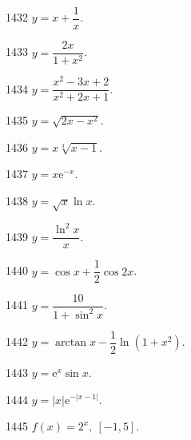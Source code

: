 \begin{prob}[S]{1432}
$y = x + \dfrac{1}{x}$.
\end{prob}

\begin{prob}[S]{1433}
$y = \dfrac{2x}{1 + x^2}$.
\end{prob}

\begin{prob}[S]{1434}
$y = \dfrac{x^2 - 3x + 2}{x^2 + 2x + 1}$.
\end{prob}

\begin{prob}[S]{1435}
$y = \sqrt{2x - x^2}$.
\end{prob}

\begin{prob}[S]{1436}
$y = x\sqrt[3]{x - 1}$.
\end{prob}

\begin{prob}[S]{1437}
$y = x\mathrm{e}^{-x}$.
\end{prob}

\begin{prob}[S]{1438}
$y = \sqrt{x} \ln x$.
\end{prob}

\begin{prob}[S]{1439}
$y = \dfrac{\ln^2 x}{x}$.
\end{prob}

\begin{prob}[S]{1440}
$y = \cos x + \dfrac{1}{2} \cos 2x$.
\end{prob}

\begin{prob}[S]{1441}
$y = \dfrac{10}{1 + \sin^2 x}$.
\end{prob}

\begin{prob}[S]{1442}
$y = \arctan x - \dfrac{1}{2} \ln(1 + x^2)$.
\end{prob}

\begin{prob}[S]{1443}
$y = \mathrm{e}^x \sin x$.
\end{prob}

\begin{prob}[S]{1444}
$y = |x|\mathrm{e}^{-|x - 1|}$.
\end{prob}


\begin{prob}[S]{1445}
$f(x) = 2^x, \ [-1, 5]$.
\end{prob}

